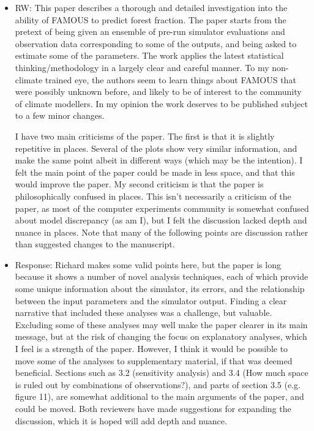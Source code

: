 \documentclass[esd, manuscript]{copernicus}
\begin{document}
\begin{itemize}
\item{RW: This paper describes a thorough and detailed investigation into the ability of FAMOUS to predict forest fraction. The paper starts from the pretext of being given an ensemble of pre-run simulator evaluations and observation data corresponding to some of the outputs, and being asked to estimate some of the parameters. The work applies the latest statistical thinking/methodology in a largely clear and careful manner. To my non-climate trained eye, the authors seem to learn things about FAMOUS that were possibly unknown before, and likely to be of interest to the community of climate modellers. In my opinion the work deserves to be published subject to a few minor changes.

I have two main criticisms of the paper. The first is that it is slightly repetitive in places. Several of the plots show very similar information, and make the same point albeit in different ways (which may be the intention). I felt the main point of the paper could be made in less space, and that this would improve the paper. My second criticism is that the paper is philosophically confused in places. This isn't necessarily a criticism of the paper, as most of the computer experiments community is somewhat confused about model discrepancy (as am I), but I felt the discussion lacked depth and nuance in places. Note that many of the following points are discussion rather than suggested changes to the manuscript. }

\item{Response: Richard makes some valid points here, but the paper is long because it shows a number of novel analysis techniques, each of which provide some unique information about the simulator, its errors, and the relationship between the input parameters and the simulator output. Finding a clear narrative that included these analyses was a challenge, but valuable. Excluding some of these analyses may well make the paper clearer in its main message, but at the risk of changing the focus on explanatory analyses, which I feel is a strength of the paper. However, I think it would be possible to move some of the analyses to supplementary material, if that was deemed beneficial. Sections such as 3.2 (sensitivity analysis) and 3.4 (How much space is ruled out by combinations of observations?), and parts of section 3.5 (e.g. figure 11), are somewhat additional to the main arguments of the paper, and could be moved. Both reviewers have made suggestions for expanding the discussion, which it is hoped will add depth and nuance.}


\end{itemize}
\end{document}
